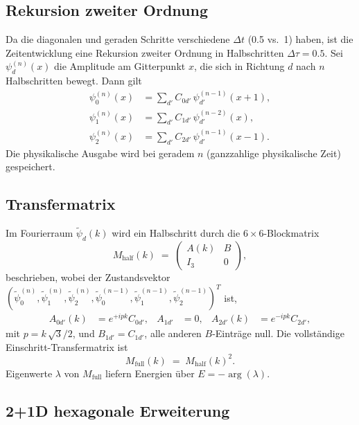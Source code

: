 \documentclass[twocolumn,showpacs,preprintnumbers,amsmath,amssymb]{revtex4-2}
\begin{document}
\subsection{Rekursion zweiter Ordnung}

Da die diagonalen und geraden Schritte verschiedene $\Delta t$ (0.5 vs.\ 1)
haben, ist die Zeitentwicklung eine Rekursion zweiter Ordnung in Halbschritten
$\Delta\tau = 0.5$.
Sei $\psi_d^{(n)}(x)$ die Amplitude am Gitterpunkt $x$, die sich in
Richtung $d$ nach $n$ Halbschritten bewegt.  Dann gilt
\begin{align}
  \psi_0^{(n)}(x) &= \sum_{d'} C_{0d'}\, \psi_{d'}^{(n-1)}(x+1),
  \label{eq:rec_left}\\
  \psi_1^{(n)}(x) &= \sum_{d'} C_{1d'}\, \psi_{d'}^{(n-2)}(x),
  \label{eq:rec_straight}\\
  \psi_2^{(n)}(x) &= \sum_{d'} C_{2d'}\, \psi_{d'}^{(n-1)}(x-1).
  \label{eq:rec_right}
\end{align}
Die physikalische Ausgabe wird bei geradem $n$ (ganzzahlige physikalische Zeit)
gespeichert.

\subsection{Transfermatrix}

Im Fourierraum $\tilde\psi_d(k)$ wird ein Halbschritt durch die
$6\times 6$-Blockmatrix
\begin{equation}
  M_{\mathrm{half}}(k) \;=\;
  \begin{pmatrix} A(k) & B \\ I_3 & 0 \end{pmatrix},
  \label{eq:TM_half}
\end{equation}
beschrieben, wobei der Zustandsvektor
$(\tilde\psi_0^{(n)}, \tilde\psi_1^{(n)}, \tilde\psi_2^{(n)},
  \tilde\psi_0^{(n-1)}, \tilde\psi_1^{(n-1)}, \tilde\psi_2^{(n-1)})^T$
ist,
\begin{align}
  A_{0d'}(k) &= e^{+ipk} C_{0d'}, &
  A_{1d'} &= 0, &
  A_{2d'}(k) &= e^{-ipk} C_{2d'},
\end{align}
mit $p = k\,\sqrt{3}/2$, und $B_{1d'} = C_{1d'}$, alle anderen
$B$-Einträge null.
Die vollständige Einschritt-Transfermatrix ist
\begin{equation}
  M_{\mathrm{full}}(k) \;=\; M_{\mathrm{half}}(k)^2.
  \label{eq:TM_full}
\end{equation}
Eigenwerte $\lambda$ von $M_{\mathrm{full}}$ liefern Energien über
$E = -\arg(\lambda)$.

\subsection{2+1D hexagonale Erweiterung}
\end{document}
